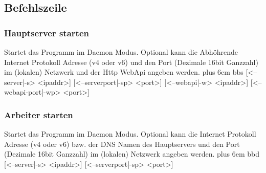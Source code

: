 \documentclass[a4paper,12pt]{article}
\makeatletter
\newenvironment{mycode}
 {\def\@xobeysp{\ }\verbatim\rightskip=0pt plus 6em\relax}
 {\endverbatim}
\makeatother
\begin{document}
\begin{center}
\end{center}

\clearpage


\clearpage

\subsection{Befehlszeile}

\subsubsection{Hauptserver starten}
Startet das Programm im \gls{Daemon} Modus. Optional kann die Abhöhrende Internet Protokoll Adresse (v4 oder v6) und den Port (Dezimale 16bit Ganzzahl) im (lokalen) Netzwerk und der Http WebApi angeben werden.
\begin{mycode}
bbs [<--server|-s> <ipaddr>] [<--serverport|-sp> <port>] [<--webapi|-w> <ipaddr>] [<--webapi-port|-wp> <port>]
\end{mycode}

\subsubsection{Arbeiter starten}
Startet das Programm im \gls{Daemon} Modus. Optional kann die Internet Protokoll Adresse (v4 oder v6) bzw. der DNS Namen des Hauptservers und den Port (Dezimale 16bit Ganzzahl) im (lokalen) Netzwerk angeben werden.
\begin{mycode}
bbd [<--server|-s> <ipaddr>] [<--serverport|-sp> <port>]
\end{mycode}
\end{document}
